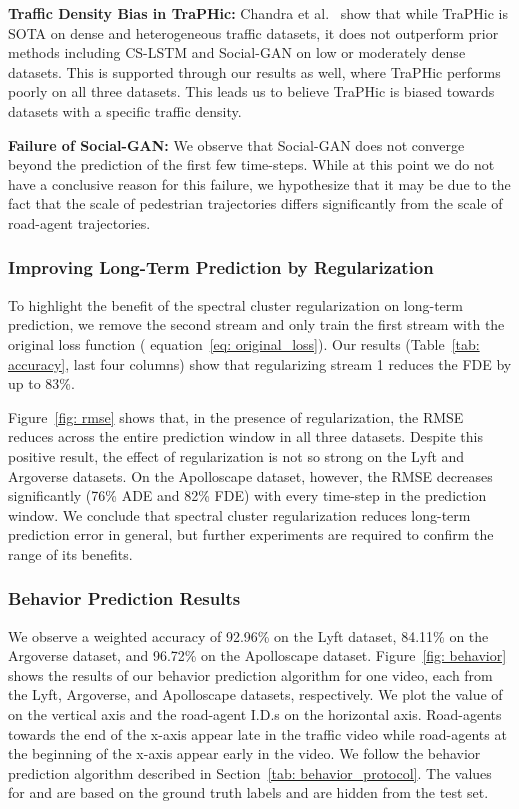 \documentclass[10pt,twocolumn,letterpaper]{article}
\theoremstyle{plain}
\begin{document}
\textbf{Traffic Density Bias in TraPHic:} Chandra et al.~\cite{traphic} show that while TraPHic is SOTA on dense and heterogeneous traffic datasets, it does not outperform prior methods including CS-LSTM and Social-GAN on low or moderately dense datasets. This is supported through our results as well, where TraPHic performs poorly on all three datasets. This leads us to believe TraPHic is biased towards datasets with a specific traffic density.

\textbf{Failure of Social-GAN:} We observe that Social-GAN does not converge beyond the prediction of the first few time-steps. While at this point we do not have a conclusive reason for this failure, we hypothesize that it may be due to the fact that the scale of pedestrian trajectories differs significantly from the scale of road-agent trajectories. 
\subsubsection{Improving Long-Term Prediction by Regularization}

To highlight the benefit of the spectral cluster regularization on long-term prediction, we remove the second stream and only train the first stream with the original loss function ( equation~\ref{eq: original_loss}). Our results (Table~\ref{tab: accuracy}, last four columns) show that regularizing stream 1 reduces the FDE by up to 83\%. 

Figure~\ref{fig: rmse} shows that, in the presence of regularization, the RMSE reduces across the entire prediction window in all three datasets. Despite this positive result, the effect of regularization is not so strong on the Lyft and Argoverse datasets. On the Apolloscape dataset, however, the RMSE decreases significantly (76\% ADE and 82\% FDE) with every time-step in the prediction window. We conclude that spectral cluster regularization reduces long-term prediction error in general, but further experiments are required to confirm the range of its benefits.
\subsubsection{Behavior Prediction Results} 
We observe a weighted accuracy of 92.96\% on the Lyft dataset, 84.11\% on the Argoverse dataset, and 96.72\% on the Apolloscape dataset. Figure~\ref{fig: behavior} shows the results of our behavior prediction algorithm for one video, each from the Lyft, Argoverse, and Apolloscape datasets, respectively. We plot the value of  on the vertical axis and the road-agent I.D.s on the horizontal axis. Road-agents towards the end of the x-axis appear late in the traffic video while road-agents at the beginning of the x-axis appear early in the video. We follow the behavior prediction algorithm described in Section~\ref{tab: behavior_protocol}. The values for  and  are based on the ground truth labels and are hidden from the test set. 
\end{document}
